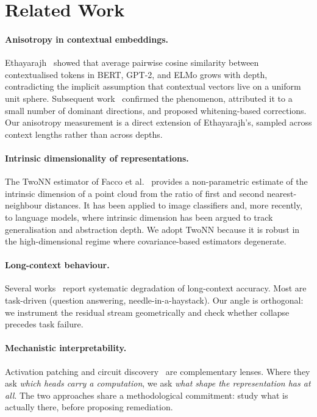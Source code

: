 \section{Related Work}\label{sec:related}

\paragraph{Anisotropy in contextual embeddings.} Ethayarajh~\cite{ethayarajh2019contextual}
showed that average pairwise cosine similarity between contextualised tokens
in BERT, GPT-2, and ELMo grows with depth, contradicting the implicit
assumption that contextual vectors live on a uniform unit sphere. Subsequent
work~\cite{cai2021isotropy,bis2021too} confirmed the phenomenon, attributed
it to a small number of dominant directions, and proposed whitening-based
corrections. Our anisotropy measurement is a direct extension of
Ethayarajh's, sampled across context lengths rather than across depths.

\paragraph{Intrinsic dimensionality of representations.} The TwoNN estimator
of Facco et al.~\cite{facco2017twonn} provides a non-parametric estimate of
the intrinsic dimension of a point cloud from the ratio of first and second
nearest-neighbour distances. It has been applied to image classifiers
\cite{ansuini2019id} and, more recently, to language models, where intrinsic
dimension has been argued to track generalisation and abstraction depth.
We adopt TwoNN because it is robust in the high-dimensional regime where
covariance-based estimators degenerate.

\paragraph{Long-context behaviour.} Several works~\cite{liu2024lost,xiong2024effective}
report systematic degradation of long-context accuracy. Most are
task-driven (question answering, needle-in-a-haystack). Our angle is
orthogonal: we instrument the residual stream geometrically and check
whether collapse precedes task failure.

\paragraph{Mechanistic interpretability.} Activation patching and circuit
discovery~\cite{wang2022interpret,nanda2023progress} are complementary
lenses. Where they ask \emph{which heads carry a computation}, we ask
\emph{what shape the representation has at all}. The two approaches share
a methodological commitment: study what is actually there, before
proposing remediation.
